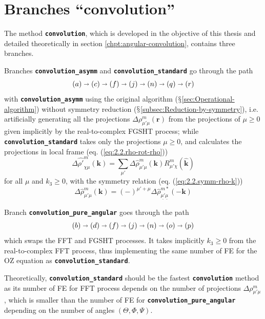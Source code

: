 \section{Branches ``convolution''}

The method \texttt{\textbf{convolution}}, which is developed in the
objective of this thesis and detailed theoretically in section \ref{chpt:angular-convolution},
contains three branches.

Branches\textbf{ }\texttt{\textbf{convolution\_asymm}} and \texttt{\textbf{convolution\_standard}}
go through the path
\[
\left(a\right)\shortrightarrow\left(c\right)\shortrightarrow\left(f\right)\shortrightarrow\left(j\right)\shortrightarrow\left(n\right)\shortrightarrow\left(q\right)\shortrightarrow\left(r\right)
\]
with \texttt{\textbf{convolution\_asymm}} using the original algorithm
($\mathsection$\ref{sec:Operational-algorithm}) without symmetry
reduction ($\mathsection$\ref{subsec:Reduction-by-symmetry}), i.e.
artificially generating all the projections $\Delta\rho_{\mu'\mu}^{m}(\mathbf{r})$
from the projections of $\mu\geq0$ given implicitly by the real-to-complex
\acs{FGSHT} process; while \texttt{\textbf{convolution\_standard}}
takes only the projections $\mu\geq0$, and calculates the projections
in local frame (eq. (\ref{eq:2.2.rho-rot-rho}))
\begin{equation}
\Delta\hat{\rho'}_{\chi\mu}^{m}(\mathbf{k})=\sum_{\mu'}\Delta\hat{\rho}_{\mu'\mu}^{m}(\mathbf{k})R_{\mu'\chi}^{m}(\mathbf{\hat{k}})
\end{equation}
 for all $\mu$ and $k_{3}\geq0$, with the symmetry relation (eq.
(\ref{eq:2.2.symm-rho-k}))
\begin{equation}
\Delta\hat{\rho}_{\mu'\mu}^{m}(\mathbf{k})=(-)^{\mu'+\mu}\Delta\hat{\rho}_{\underline{\mu'}\underline{\mu}}^{m*}(-\mathbf{k})
\end{equation}

Branch \texttt{\textbf{convolution\_pure\_angular}} goes through the
path 
\[
\left(b\right)\shortrightarrow\left(d\right)\shortrightarrow\left(f\right)\shortrightarrow\left(j\right)\shortrightarrow\left(n\right)\shortrightarrow\left(o\right)\shortrightarrow\left(p\right)
\]
which swaps the \acs{FFT} and \acs{FGSHT} processes. It takes implicitly
$k_{3}\geq0$ from the real-to-complex \acs{FFT} process, thus implementing
the same number of \acs{FE} for the \acs{OZ} equation as \texttt{\textbf{convolution\_standard}}.

Theoretically, \texttt{\textbf{convolution\_standard}} should be the
fastest \texttt{\textbf{convolution}} method as its number of \acs{FE}
for \acs{FFT} process depends on the number of projections $\Delta\rho_{\mu'\mu}^{m}$,
which is smaller than the number of \acs{FE} for \texttt{\textbf{convolution\_pure\_angular}}
depending on the number of angles $(\Theta,\Phi,\Psi)$.

